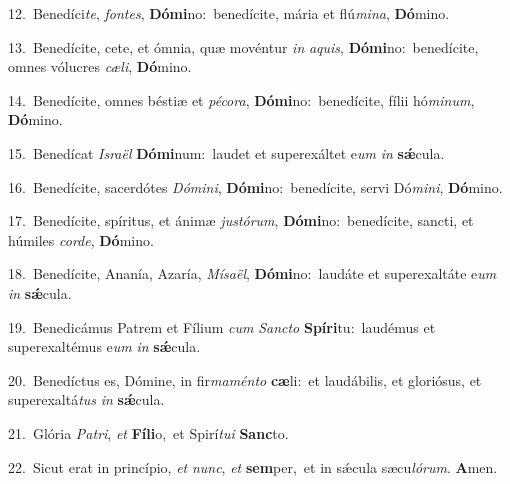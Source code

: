 {\numbfont\textcolor{\numbcolor}{12.}}~Benedíci\-\textit{te}\-, \textit{fon}\-\textit{tes}, \textbf{Dó}\-\textbf{mi}no:~\star benedícite, mária et flú\-\textit{mi}\-\textit{na}, \textbf{Dó}\-mino.\par
{\numbfont\textcolor{\numbcolor}{13.}}~Benedícite, cete, et ómnia, quæ movéntur \textit{in} \textit{a}\-\textit{quis}, \textbf{Dó}\-\textbf{mi}no:~\star benedícite, omnes vólucres \textit{cæ}\-\textit{li}, \textbf{Dó}\-mino.\par
{\numbfont\textcolor{\numbcolor}{14.}}~Benedícite, omnes béstiæ et \textit{pé}\-\textit{co}\textit{ra}, \textbf{Dó}\-\textbf{mi}no:~\star benedícite, fílii hó\-\textit{mi}\-\textit{num}, \textbf{Dó}\-mino.\par
{\numbfont\textcolor{\numbcolor}{15.}}~Benedícat \textit{Is}\-\textit{ra}\textit{ël} \textbf{Dó}\-\textbf{mi}num:~\star laudet et superexáltet e\textit{um} \textit{in} \textbf{sǽ}\-cula.\par
{\numbfont\textcolor{\numbcolor}{16.}}~Benedícite, sacerdótes \textit{Dó}\-\textit{mi}\textit{ni}, \textbf{Dó}\-\textbf{mi}no:~\star benedícite, servi Dó\-\textit{mi}\-\textit{ni}, \textbf{Dó}\-mino.\par
{\numbfont\textcolor{\numbcolor}{17.}}~Benedícite, spíritus, et ánimæ \textit{jus}\-\textit{tó}\textit{rum}, \textbf{Dó}\-\textbf{mi}no:~\star benedícite, sancti, et húmiles \textit{cor}\-\textit{de}, \textbf{Dó}\-mino.\par
{\numbfont\textcolor{\numbcolor}{18.}}~Benedícite, Ananía, Azaría, \textit{Mí}\-\textit{sa}\textit{ël}, \textbf{Dó}\-\textbf{mi}no:~\star laudáte et superexaltáte e\textit{um} \textit{in} \textbf{sǽ}\-cula.\par
{\numbfont\textcolor{\numbcolor}{19.}}~Benedicámus Patrem et Fílium \textit{cum} \textit{Sanc}\-\textit{to} \textbf{Spí}\-\textbf{ri}tu:~\star laudémus et superexaltémus e\textit{um} \textit{in} \textbf{sǽ}\-cula.\par
{\numbfont\textcolor{\numbcolor}{20.}}~Benedíctus es, Dómine, in fir\-\textit{ma}\-\textit{mén}\textit{to} \textbf{cæ}\-li:~\star et laudábilis, et gloriósus, et superexaltá\textit{tus} \textit{in} \textbf{sǽ}\-cula.\par
{\numbfont\textcolor{\numbcolor}{21.}}~Glória \textit{Pa}\-\textit{tri}, \textit{et} \textbf{Fí}\-\textbf{li}o,~\star et Spirí\-\textit{tu}\-\textit{i} \textbf{Sanc}\-to.\par
{\numbfont\textcolor{\numbcolor}{22.}}~Sicut erat in princípio, \textit{et} \textit{nunc}\-, \textit{et} \textbf{sem}\-per,~\star et in sǽcula sæcu\-\textit{ló}\-\textit{rum}. \textbf{A}\-men.\par
